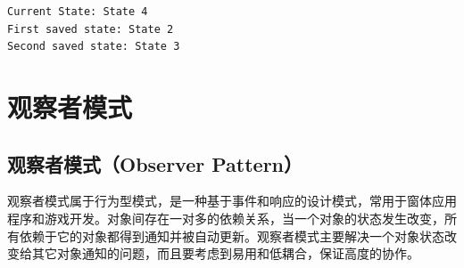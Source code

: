 \begin{tcolorbox}
    \begin{verbatim}
Current State: State 4
First saved state: State 2
Second saved state: State 3
\end{verbatim}
\end{tcolorbox}

\newpage

\section{观察者模式}

\subsection{观察者模式（Observer Pattern）}

观察者模式属于行为型模式，是一种基于事件和响应的设计模式，常用于窗体应用程序和游戏开发。对象间存在一对多的依赖关系，当一个对象的状态发生改变，所有依赖于它的对象都得到通知并被自动更新。观察者模式主要解决一个对象状态改变给其它对象通知的问题，而且要考虑到易用和低耦合，保证高度的协作。\\

\\

